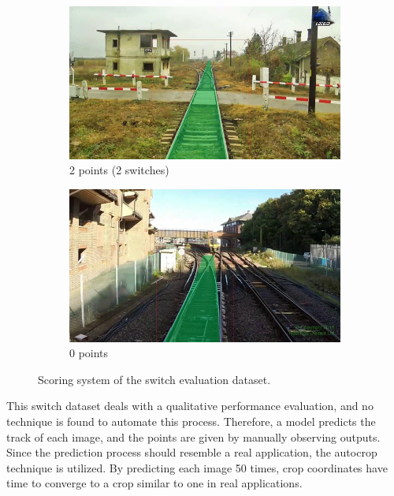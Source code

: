 \begin{figure}[H]
    \begin{subfigure}[b]{0.48\textwidth}
        \centering
        \includegraphics[width=\textwidth]{PICs/usedDatasets/2punkte.jpg}
        \caption{2 points (2 switches)}
    \end{subfigure}
    \hfill
    \begin{subfigure}[b]{0.48\textwidth}
        \centering
        \includegraphics[width=\textwidth]{PICs/usedDatasets/0punkte.jpg}
        \caption{0 points}
    \end{subfigure}
    \caption{Scoring system of the switch evaluation dataset.}
    \label{fig:pointSystem}
\end{figure}

\noindent This switch dataset deals with a qualitative performance evaluation, and no technique is found to automate this process.
Therefore, a model predicts the track of each image, and the points are given by manually observing outputs.
Since the prediction process should resemble a real application, the autocrop technique is utilized.
By predicting each image 50 times, crop coordinates have time to converge to a crop similar to one in real applications.

